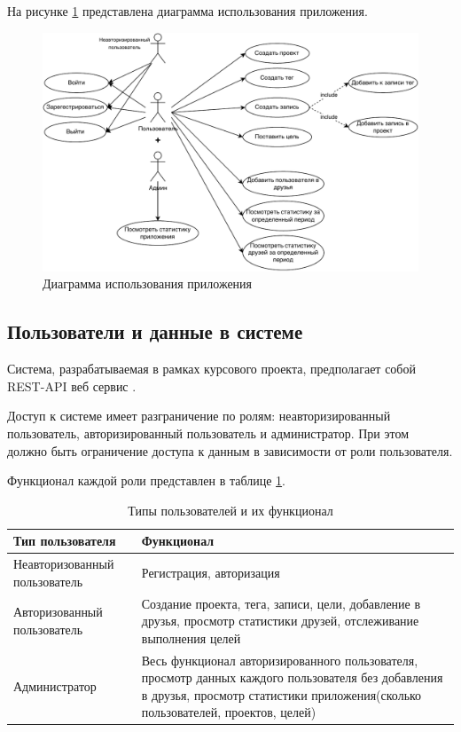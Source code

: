 \newpage

На рисунке \ref{fig:usecase} представлена диаграмма использования приложения.
\begin{figure}[hbtp]
	\centering
	\includegraphics[width=\textwidth]{img/Usecase.drawio.pdf}
	\caption{Диаграмма использования приложения}
	\label{fig:usecase}
\end{figure}

\subsection{Пользователи и данные в системе}

Система, разрабатываемая в рамках курсового проекта, предполагает собой REST-API веб сервис \cite{rest-api}.

Доступ к системе имеет разграничение по ролям: неавторизированный пользователь, авторизированный пользователь и администратор. При этом\\ должно быть ограничение доступа к данным в зависимости от роли пользователя.

\newpage
Функционал каждой роли представлен в таблице \ref{tbl:role}.

\begin{table}[h]
	\centering
	\caption{Типы пользователей и их функционал}
	\label{tbl:role}
	\begin{tabular}{|l|p{9cm}|}
		\hline
		\textbf{Тип пользователя} &\textbf{Функционал} \\
		\hline
		Неавторизованный пользователь & Регистрация, авторизация \\
		\hline
		Авторизованный пользователь & Создание проекта, тега, записи, цели, добавление в друзья, просмотр статистики друзей, отслеживание выполнения целей \\
		\hline
		Администратор & Весь функционал авторизированного пользователя, просмотр данных каждого пользователя без добавления в друзья, просмотр статистики приложения(сколько пользователей, проектов, целей)\\
		\hline
	\end{tabular}
\end{table}

